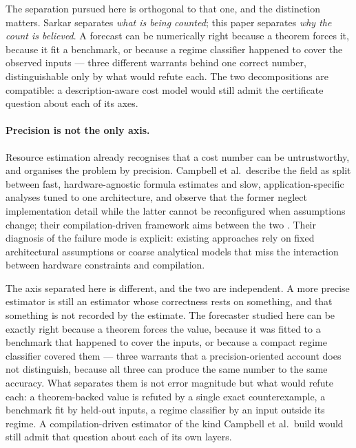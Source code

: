 The separation pursued here is orthogonal to that one, and the distinction matters. Sarkar separates \emph{what is being counted}; this paper separates \emph{why the count is believed}. A forecast can be numerically right because a theorem forces it, because it fit a benchmark, or because a regime classifier happened to cover the observed inputs --- three different warrants behind one correct number, distinguishable only by what would refute each. The two decompositions are compatible: a description-aware cost model would still admit the certificate question about each of its axes.

\paragraph{Precision is not the only axis.}
Resource estimation already recognises that a cost number can be untrustworthy, and organises the problem by precision. Campbell et al.\ describe the field as split between fast, hardware-agnostic formula estimates and slow, application-specific analyses tuned to one architecture, and observe that the former neglect implementation detail while the latter cannot be reconfigured when assumptions change; their compilation-driven framework aims between the two \cite{campbell2026resourceestimation}. Their diagnosis of the failure mode is explicit: existing approaches rely on fixed architectural assumptions or coarse analytical models that miss the interaction between hardware constraints and compilation.

The axis separated here is different, and the two are independent. A more precise estimator is still an estimator whose correctness rests on something, and that something is not recorded by the estimate. The forecaster studied here can be exactly right because a theorem forces the value, because it was fitted to a benchmark that happened to cover the inputs, or because a compact regime classifier covered them --- three warrants that a precision-oriented account does not distinguish, because all three can produce the same number to the same accuracy. What separates them is not error magnitude but what would refute each: a theorem-backed value is refuted by a single exact counterexample, a benchmark fit by held-out inputs, a regime classifier by an input outside its regime. A compilation-driven estimator of the kind Campbell et al.\ build would still admit that question about each of its own layers.

